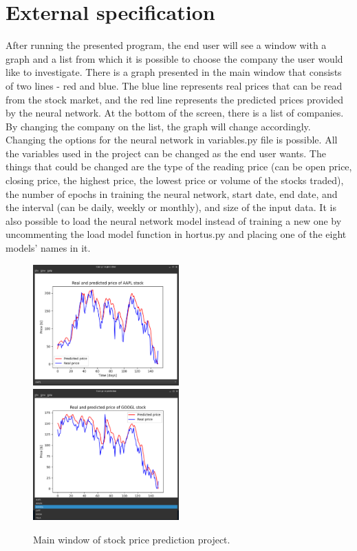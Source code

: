 \chapter{External specification}


After running the presented program, the end user will see a window with a graph and a list from which it is possible to choose the company the user would like to investigate. There is a graph presented in the main window that consists of two lines - red and blue. The blue line represents real prices that can be read from the stock market, and the red line represents the predicted prices provided by the neural network. At the bottom of the screen, there is a list of companies. By changing the company on the list, the graph will change accordingly.
Changing the options for the neural network in variables.py file is possible. All the variables used in the project can be changed as the end user wants. The things that could be changed are the type of the reading price (can be open price, closing price, the highest price, the lowest price or volume of the stocks traded), the number of epochs in training the neural network, start date, end date, and the interval (can be daily, weekly or monthly), and size of the input data.
It is also possible to load the neural network model instead of training a new one by uncommenting the load model function in hortus.py and placing one of the eight models' names in it.

 
\begin{figure}
\centering
\includegraphics[width=0.5\textwidth]{./graf/MainWindow.png}
\includegraphics[width=0.5\textwidth]{./graf/MainWindow_select.png}
\caption{Main window of stock price prediction project.}
\label{fig:label}
\end{figure}

